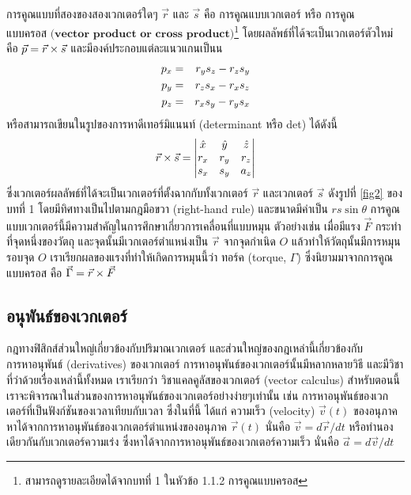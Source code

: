 การคูณแบบที่สองของสองเวกเตอร์ใดๆ $\vec{r}$ และ $\vec{s}$ คือ $\textbf{การคูณแบบเวกเตอร์ หรือ การคูณ}$ $\textbf{แบบครอส (vector product or cross product)}$\footnote{สามารถดูรายละเอียดได้จากบทที่ 1 ในหัวข้อ 1.1.2 การคูณแบบครอส} โดยผลลัพธ์ที่ได้จะเป็นเวกเตอร์ตัวใหม่ คือ $\vec{p} = \vec{r}\times\vec{s}$ และมีองค์ประกอบแต่ละแนวแกนเป็นน
\begin{eqnarray}\label{Eqn:CompCrossProduct}
p_x &=& r_ys_z - r_zs_y \nonumber \\
p_y &=& r_zs_x - r_xs_z \\
p_z &=& r_xs_y - r_ys_x \nonumber
\end{eqnarray}
หรือสามารถเขียนในรูปของการหาดีเทอร์มิแนนท์ (determinant หรือ det) ได้ดังนี้
\begin{equation}\label{Eqn:CrossProductDet}
\vec{r}\times\vec{s} = \begin{vmatrix} 
										\hat{x} & \hat{y} & \hat{z} \\ 
										r_x & r_y & r_z \\ 
										s_x & s_y & a_z 
									\end{vmatrix}
\end{equation}
ซึ่งเวกเตอร์ผลลัพธ์ที่ได้จะเป็นเวกเตอร์ที่ตั้งฉากกับทั้งเวกเตอร์ $\vec{r}$ และเวกเตอร์ $\vec{s}$ ดังรูปที่ \ref{fig2} ของบทที่ 1 โดยมีทิศทางเป็นไปตามกฎมือขวา (right-hand rule) และขนาดมีค่าเป็น $rs \sin{\theta}$ การคูณแบบเวกเตอร์นี้มีความสำคัญในการศึกษาเกี่ยวการเคลื่อนที่แบบหมุน ตัวอย่างเช่น เมื่อมีแรง $\vec{F}$ กระทำที่จุดหนึ่งของวัตถุ และจุดนั้นมีเวกเตอร์ตำแหน่งเป็น $\vec{r}$ จากจุดกำเนิด $O$ แล้วทำให้วัตถุนั้นมีการหมุนรอบจุด $O$ เราเรียกผลของแรงที่ทำให้เกิดการหมุนนี้ว่า ทอร์ค (torque, $\Gamma$) ซึ่งนิยามมาจากการคูณแบบครอส คือ $\vec{\Gamma} = \vec{r}\times\vec{F}$


\subsection{อนุพันธ์ของเวกเตอร์}
\label{SubSec:VectorDerivatives}

กฎทางฟิสิกส์ส่วนใหญ่เกี่ยวข้องกับปริมาณเวกเตอร์ และส่วนใหญ่ของกฎเหล่านี้เกี่ยวข้องกับ$\textit{การหาอนุพันธ์}$ (derivatives) ของเวกเตอร์ การหาอนุพันธ์ของเวกเตอร์นั้นมีหลากหลายวิธี และมีวิชาที่ว่าด้วยเรื่องเหล่านี้ทั้งหมด เราเรียกว่า วิชาแคลคูลัสของเวกเตอร์ (vector calculus) สำหรับตอนนี้ เราจะพิจารณาในส่วนของการหาอนุพันธ์ของเวกเตอร์อย่างง่ายๆเท่านั้น เช่น การหาอนุพันธ์ของเวกเตอร์ที่เป็นฟังก์ชันของเวลาเทียบกับเวลา ซึ่งในที่นี้ ได้แก่ ความเร็ว (velocity) $\vec{v}(t)$ ของอนุภาค หาได้จากการหาอนุพันธ์ของเวกเตอร์ตำแหน่งของอนุภาค $\vec{r}(t)$ นั่นคือ $\vec{v} = d\vec{r}/dt$ หรือทำนองเดียวกันกับเวกเตอร์ความเร่ง ซึ่งหาได้จากการหาอนุพันธ์ของเวกเตอร์ความเร็ว นั่นคือ $\vec{a} = d\vec{v}/dt$

